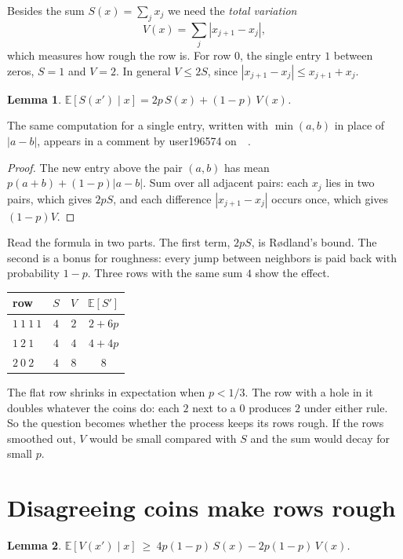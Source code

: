 \documentclass[11pt]{article}
\newtheorem{lemma}{Lemma}
\theoremstyle{remark}
\newcommand{\E}{\mathbb{E}}
\begin{document}
Besides the sum $S(x)=\sum_j x_j$ we need the \emph{total variation}
\[
V(x)=\sum_j |x_{j+1}-x_j| ,
\]
which measures how rough the row is. For row $0$, the single entry $1$ between zeros, $S=1$ and $V=2$. In general $V\le 2S$, since $|x_{j+1}-x_j|\le x_{j+1}+x_j$.

\begin{lemma}\label{lem:S}
$\E[S(x')\mid x]=2p\,S(x)+(1-p)\,V(x)$.
\end{lemma}

The same computation for a single entry, written with $\min(a,b)$ in place of $|a-b|$, appears in a comment by user196574 on~\cite{MO}~\cite{comment}.

\begin{proof}
The new entry above the pair $(a,b)$ has mean $p(a+b)+(1-p)|a-b|$. Sum over all adjacent pairs: each $x_j$ lies in two pairs, which gives $2pS$, and each difference $|x_{j+1}-x_j|$ occurs once, which gives $(1-p)V$.
\end{proof}

Read the formula in two parts. The first term, $2pS$, is R{\o}dland's bound. The second is a bonus for roughness: every jump between neighbors is paid back with probability $1-p$. Three rows with the same sum $4$ show the effect.
\begin{center}
\begin{tabular}{lccc}
\toprule
row & $S$ & $V$ & $\E[S']$\\
\midrule
$1\ 1\ 1\ 1$ & $4$ & $2$ & $2+6p$\\
$1\ 2\ 1$ & $4$ & $4$ & $4+4p$\\
$2\ 0\ 2$ & $4$ & $8$ & $8$\\
\bottomrule
\end{tabular}
\end{center}
The flat row shrinks in expectation when $p<1/3$. The row with a hole in it doubles whatever the coins do: each $2$ next to a $0$ produces $2$ under either rule. So the question becomes whether the process keeps its rows rough. If the rows smoothed out, $V$ would be small compared with $S$ and the sum would decay for small $p$.

\section{Disagreeing coins make rows rough}

\begin{lemma}\label{lem:V}
$\E[V(x')\mid x]\ \ge\ 4p(1-p)\,S(x)-2p(1-p)\,V(x)$.
\end{lemma}
\end{document}
